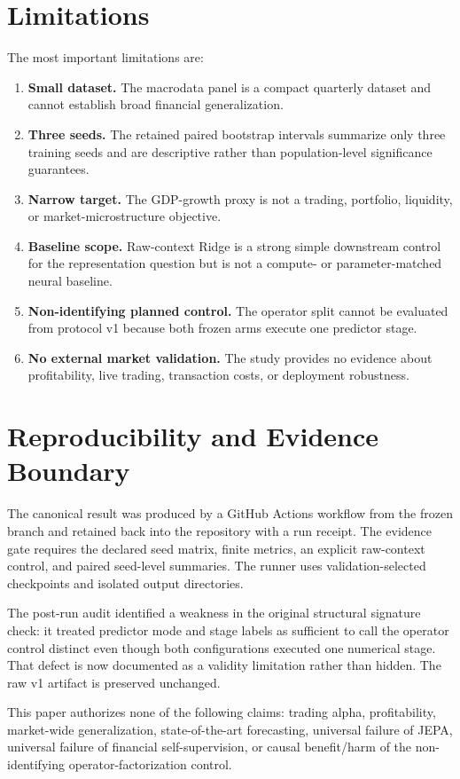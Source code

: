 \documentclass[11pt]{article}
\begin{document}
\section{Limitations}
The most important limitations are:
\begin{enumerate}[leftmargin=1.5em]
    \item \textbf{Small dataset.} The macrodata panel is a compact quarterly dataset and cannot establish broad financial generalization.
    \item \textbf{Three seeds.} The retained paired bootstrap intervals summarize only three training seeds and are descriptive rather than population-level significance guarantees.
    \item \textbf{Narrow target.} The GDP-growth proxy is not a trading, portfolio, liquidity, or market-microstructure objective.
    \item \textbf{Baseline scope.} Raw-context Ridge is a strong simple downstream control for the representation question but is not a compute- or parameter-matched neural baseline.
    \item \textbf{Non-identifying planned control.} The operator split cannot be evaluated from protocol v1 because both frozen arms execute one predictor stage.
    \item \textbf{No external market validation.} The study provides no evidence about profitability, live trading, transaction costs, or deployment robustness.
\end{enumerate}

\section{Reproducibility and Evidence Boundary}
The canonical result was produced by a GitHub Actions workflow from the frozen branch and retained back into the repository with a run receipt. The evidence gate requires the declared seed matrix, finite metrics, an explicit raw-context control, and paired seed-level summaries. The runner uses validation-selected checkpoints and isolated output directories.

The post-run audit identified a weakness in the original structural signature check: it treated predictor mode and stage labels as sufficient to call the operator control distinct even though both configurations executed one numerical stage. That defect is now documented as a validity limitation rather than hidden. The raw v1 artifact is preserved unchanged.

This paper authorizes none of the following claims: trading alpha, profitability, market-wide generalization, state-of-the-art forecasting, universal failure of JEPA, universal failure of financial self-supervision, or causal benefit/harm of the non-identifying operator-factorization control.
\end{document}
